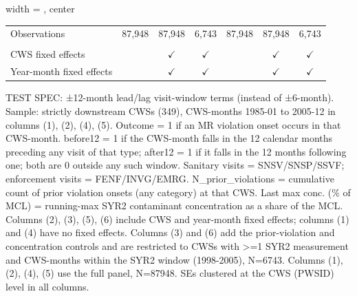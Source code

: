 \begin{table}[htbp]
\begin{adjustbox}{width = \textwidth, center}
\begin{tabular}{lcccccc}
          \\
         
         Observations                           & 87,948         & 87,948        & 6,743         & 87,948         & 87,948         & 6,743\\  
         
          \\
         
         CWS fixed effects                      &                & $\checkmark$  & $\checkmark$  &                & $\checkmark$   & $\checkmark$\\   
         Year-month fixed effects               &                & $\checkmark$  & $\checkmark$  &                & $\checkmark$   & $\checkmark$\\   
         
         \bottomrule
         
      \end{tabular}
      
      
      
   \end{adjustbox}
      {\tiny\linespread{1}\selectfont \par \raggedright 
   TEST SPEC: ±12-month lead/lag visit-window terms (instead of ±6-month). Sample: strictly downstream CWSs (349), CWS-months 1985-01 to 2005-12 in columns (1), (2), (4), (5). Outcome = 1 if an MR violation onset occurs in that CWS-month. before12 = 1 if the CWS-month falls in the 12 calendar months preceding any visit of that type; after12 = 1 if it falls in the 12 months following one; both are 0 outside any such window. Sanitary visits = SNSV/SNSP/SSVF; enforcement visits = FENF/INVG/EMRG. N\_prior\_violations = cumulative count of prior violation onsets (any category) at that CWS. Last max conc. (\% of MCL) = running-max SYR2 contaminant concentration as a share of the MCL. Columns (2), (3), (5), (6) include CWS and year-month fixed effects; columns (1) and (4) have no fixed effects. Columns (3) and (6) add the prior-violation and concentration controls and are restricted to CWSs with >=1 SYR2 measurement and CWS-months within the SYR2 window (1998-2005), N=6743. Columns (1), (2), (4), (5) use the full panel, N=87948. SEs clustered at the CWS (PWSID) level in all columns.}
   
\end{table}


